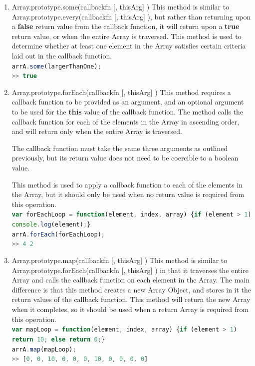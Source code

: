 \documentclass[a4paper,11pt,twoside]{report}
\def\jsinline{\lstinline[language=JavaScript, basicstyle=\small]}
\begin{document}
\begin{enumerate}
This method is used to determine whether every single element in an Array satisfies certain criteria laid out in the callback function.\\
\jsinline|var largerThanOne = function(element, index, array) {return element > 1;}|\\
\jsinline|arrA.every(largerThanOne);|\\
\jsinline|>> false|

\item Array.prototype.some(callbackfn [, thisArg] ) \newline
This method is similar to Array.prototype.every(callbackfn [, thisArg] ), but rather than returning upon a \textbf{false} return value from the callback function, it will return upon a \textbf{true} return value, or when the entire Array is traversed. This method is used to determine whether at least one element in the Array satisfies certain criteria laid out in the callback function.\\
\jsinline|arrA.some(largerThanOne);|\\
\jsinline|>> true|

\item Array.prototype.forEach(callbackfn [, thisArg] ) \newline
This method requires a callback function to be provided as an argument, and an optional argument to be used for the \textbf{this} value of the callback function. The method calls the callback function for each of the elements in the Array in ascending order, and will return only when the entire Array is traversed.

The callback function must take the same three arguments as outlined previously, but its return value does not need to be coercible to a boolean value.

This method is used to apply a callback function to each of the elements in the Array, but it should only be used when no return value is required from this operation.\\
\jsinline|var forEachLoop = function(element, index, array) {if (element > 1) console.log(element);}|\\
\jsinline|arrA.forEach(forEachLoop);|\\
\jsinline|>> 4 2|

\item Array.prototype.map(callbackfn [, thisArg] ) \newline
This method is similar to Array.prototype.forEach(callbackfn [, thisArg] ) in that it traverses the entire Array and calls the callback function on each element in the Array. The main difference is that this method creates a new Array Object, and stores in it the return values of the callback function. This method will return the new Array when it completes, so it should be used when a return Array is required from this operation.\\
\jsinline|var mapLoop = function(element, index, array) {if (element > 1) return 10; else return 0;}|\\
\jsinline|arrA.map(mapLoop);|\\
\jsinline|>> [0, 0, 10, 0, 0, 0, 10, 0, 0, 0, 0]|


\end{enumerate}
\end{document}

